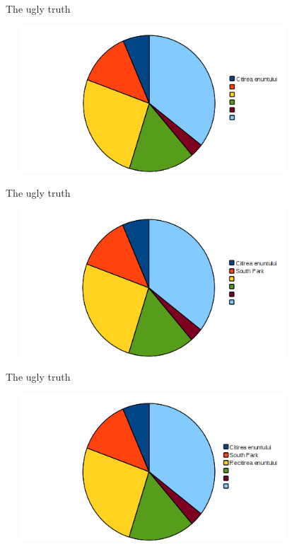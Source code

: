 \documentclass{beamer}
\begin{document}
\begin{frame}{The ugly truth}
\begin{center}
\includegraphics[height=5.5cm, width=11cm]{Step2.png}
\end{center}
\end{frame}

\begin{frame}{The ugly truth}
\begin{center}
\includegraphics[height=5.5cm, width=11cm]{Step3.png}
\end{center}
\end{frame}

\begin{frame}{The ugly truth}
\begin{center}
\includegraphics[height=5.5cm, width=11cm]{Step4.png}
\end{center}
\end{frame}
\end{document}
